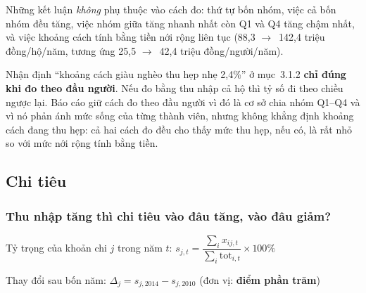 \documentclass[11pt,a4paper]{article}
\newcommand{\ra}{$\rightarrow$}
\newcommand{\n}[1]{\textbf{#1}}
\begin{document}
Những kết luận \emph{không} phụ thuộc vào cách đo: thứ tự bốn nhóm, việc cả bốn nhóm đều tăng, việc nhóm giữa tăng nhanh nhất còn Q1 và Q4 tăng chậm nhất, và việc khoảng cách tính bằng tiền nới rộng liên tục (88,3 \ra\ 142,4 triệu đồng/hộ/năm, tương ứng 25,5 \ra\ 42,4 triệu đồng/người/năm).

\begin{luuy}
Nhận định “khoảng cách giàu nghèo thu hẹp nhẹ 2,4\%” ở mục~3.1.2 \n{chỉ đúng khi đo theo đầu người}. Nếu đo bằng thu nhập cả hộ thì tỷ số đi theo chiều ngược lại. Báo cáo giữ cách đo theo đầu người vì đó là cơ sở chia nhóm Q1–Q4 và vì nó phản ánh mức sống của từng thành viên, nhưng không khẳng định khoảng cách đang thu hẹp: cả hai cách đo đều cho thấy mức thu hẹp, nếu có, là rất nhỏ so với mức nới rộng tính bằng tiền.
\end{luuy}

\subsection{Chi tiêu}

\subsubsection{Thu nhập tăng thì chi tiêu vào đâu tăng, vào đâu giảm?}

\begin{ct}
Tỷ trọng của khoản chi $j$ trong năm $t$: \quad
$s_{j,t} = \dfrac{\sum_i x_{ij,t}}{\sum_i \text{tot}_{i,t}} \times 100\%$
\smallskip

Thay đổi sau bốn năm: \quad $\Delta_j = s_{j,2014} - s_{j,2010}$ \quad (đơn vị: \n{điểm phần trăm})
\end{ct}
\end{document}
